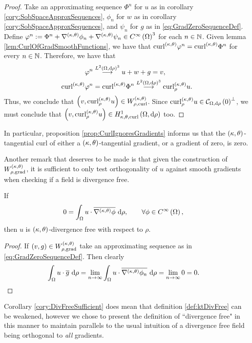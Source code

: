 \begin{proof}
	Take an approximating sequence $\Phi^n$ for $u$ as in corollary \ref{cory:SobSpaceApproxSequences}, $\phi_n$ for $w$ as in  corollary \ref{cory:SobSpaceApproxSequences}, and $\psi_n$ for $g$ as in \eqref{eq:GradZeroSequenceDef}.
	Define $\varphi^n := \Phi^n + \nabla^{\left( \kappa, \theta \right)}\phi_n + \nabla^{\left( \kappa, \theta \right)}\psi_n\in C^{\infty}\left( \Omega \right)^3$ for each $n\in\mathbb{N}$.
	Given lemma \ref{lem:CurlOfGradSmoothFunctions}, we have that $\mathrm{curl}_{}^{\left( \kappa, \theta \right)}\varphi^n = \mathrm{curl}_{}^{\left( \kappa, \theta \right)}\Phi^n$ for every $n\in\mathbb{N}$.
	Therefore, we have that
	\begin{align*}
		\varphi^n &\overset{L^{2}\left( \Omega,\mathrm{d}\rho \right)^3}{\longrightarrow} u + w + g = v, \\
		\mathrm{curl}_{}^{\left( \kappa, \theta \right)}\varphi^n &= \mathrm{curl}_{}^{\left( \kappa, \theta \right)}\Phi^n 
		\overset{L^{2}\left( \Omega,\mathrm{d}\rho \right)^3}{\longrightarrow} \mathrm{curl}_{\rho}^{\left( \kappa, \theta \right)}u.
	\end{align*}
	Thus, we conclude that $\left( v, \mathrm{curl}_{\rho}^{\left( \kappa, \theta \right)}u \right)\in W^{\left( \kappa, \theta \right)}_{\rho, \mathrm{curl}}$.
	Since $\mathrm{curl}_{\rho}^{\left( \kappa, \theta \right)}u\in\mathcal{C}_{ \Omega, \mathrm{d}\rho}\left( 0 \right)^\perp$, we must conclude that $\left(  v, \mathrm{curl}_{\rho}^{\left( \kappa, \theta \right)}u  \right)\in H^1_{\kappa,\theta,\mathrm{curl}}\left( \Omega, \mathrm{d}\rho \right)$ too.
\end{proof}
In particular, proposition \ref{prop:CurlIgnoresGradients} informs us that the $\left( \kappa, \theta \right)$-tangential curl of either a $\left( \kappa, \theta \right)$-tangential gradient, or a gradient of zero, is zero.

Another remark that deserves to be made is that given the construction of $W^{\left( \kappa, \theta \right)}_{\rho,\mathrm{grad}}$, it is sufficient to only test orthogonality of $u$ against smooth gradients when checking if a field is divergence free.
\begin{cory} \label{cory:DivFreeSufficient}
	If
	\begin{align*}
		0 &= \int_{\Omega} u\cdot\overline{\nabla^{\left( \kappa, \theta \right)}\phi}  \ \mathrm{d}\rho, \qquad\forall\phi\in C^{\infty}\left( \Omega \right),
	\end{align*}
	then $u$ is $\left( \kappa, \theta \right)$-divergence free with respect to $\rho$.
\end{cory}
\begin{proof}
	If $\left( v,g \right)\in W^{\left( \kappa, \theta \right)}_{\rho,\mathrm{grad}}$ take an approximating sequence as in \eqref{eq:GradZeroSequenceDef}.
	Then clearly
	\begin{align*}
		\int_{\Omega} u\cdot\overline{g}  \ \mathrm{d}\rho 
		&= \lim_{n\rightarrow\infty}\int_{\Omega} u\cdot\overline{\nabla^{\left( \kappa, \theta \right)}\phi_n}  \ \mathrm{d}\rho
		= \lim_{n\rightarrow\infty} 0 = 0.
	\end{align*}
\end{proof}
Corollary \ref{cory:DivFreeSufficient} does mean that definition \ref{def:ktDivFree} can be weakened, however we chose to present the definition of ``divergence free" in this manner to maintain parallels to the usual intuition of a divergence free field being orthogonal to \emph{all} gradients.